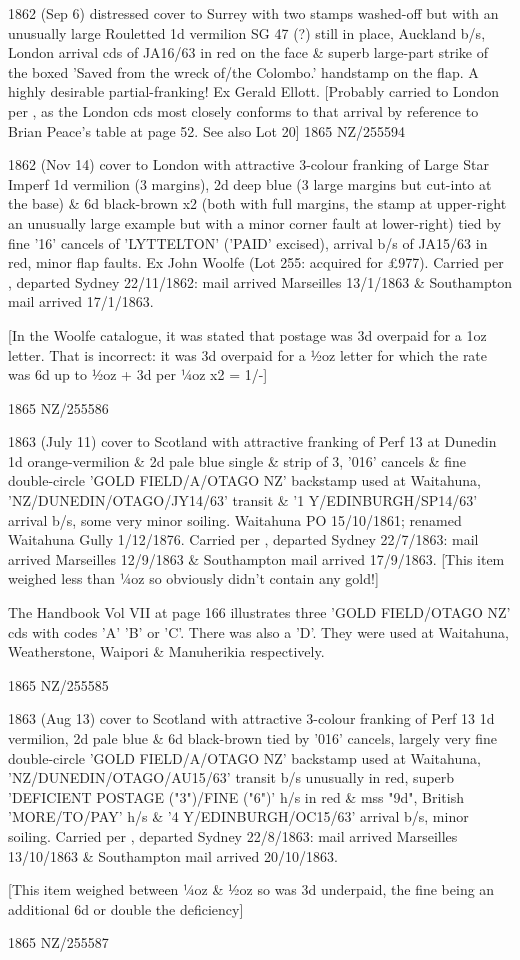 \documentclass[justified]{tufte-book}
\begin{document}
%
{1862 (Sep 6) distressed cover to Surrey with two stamps washed-off but with an unusually large Rouletted 1d vermilion SG 47 (?) still in place, Auckland b/s, London arrival cds of JA16/63 in red on the face \& superb large-part strike of the boxed 'Saved from the wreck of/the Colombo.' handstamp on the flap. A highly desirable partial-franking! Ex Gerald Ellott. [Probably carried to London per , as the London cds most closely conforms to that arrival by reference to Brian Peace's table at page 52. See also Lot 20]}%
{1865}%
{NZ/255594}%
{}%
{}
{}%
{}%

%
{1862 (Nov 14) cover to London with attractive 3-colour franking of Large Star Imperf 1d vermilion (3 margins), 2d deep blue (3 large margins but cut-into at the base) \& 6d black-brown x2 (both with full margins, the stamp at upper-right an unusually large example but with a minor corner fault at lower-right) tied by fine '16' cancels of 'LYTTELTON' ('PAID' excised), arrival b/s of JA15/63 in red, minor flap faults. Ex John Woolfe (Lot 255: acquired for £977). Carried per , departed Sydney 22/11/1862: mail arrived Marseilles 13/1/1863 \& Southampton mail arrived 17/1/1863. 

[In the Woolfe catalogue, it was stated that postage was 3d overpaid for a 1oz letter. That is incorrect: it was 3d overpaid for a ½oz letter for which the rate was 6d up to ½oz + 3d per ¼oz x2 = 1/-]}%
{1865}%
{NZ/255586}%
{}%
{}
{}%
{}%

%
{1863 (July 11) cover to Scotland with attractive franking of Perf 13 at Dunedin 1d orange-vermilion \& 2d pale blue single \& strip of 3, '016' cancels \& fine double-circle 'GOLD FIELD/A/OTAGO NZ' backstamp used at Waitahuna, 'NZ/DUNEDIN/OTAGO/JY14/63' transit \& '1 Y/EDINBURGH/SP14/63' arrival b/s, some very minor soiling. Waitahuna PO 15/10/1861; renamed Waitahuna Gully 1/12/1876. Carried per , departed Sydney 22/7/1863: mail arrived Marseilles 12/9/1863 \& Southampton mail arrived 17/9/1863. [This item weighed less than ¼oz so obviously didn't contain any gold!] 

The Handbook Vol VII at page 166 illustrates three 'GOLD FIELD/OTAGO NZ' cds with codes 'A' 'B' or 'C'. There was also a 'D'. They were used at Waitahuna, Weatherstone, Waipori \& Manuherikia respectively.}%
{1865}%
{NZ/255585}%
{}%
{}
{}%
{}%

%
{1863 (Aug 13) cover to Scotland with attractive 3-colour franking of Perf 13 1d vermilion, 2d pale blue \& 6d black-brown tied by '016' cancels, largely very fine double-circle 'GOLD FIELD/A/OTAGO NZ' backstamp used at Waitahuna, 'NZ/DUNEDIN/OTAGO/AU15/63' transit b/s unusually in red, superb 'DEFICIENT POSTAGE ("3")/FINE ("6")' h/s in red \& mss "9d", British 'MORE/TO/PAY' h/s \& '4 Y/EDINBURGH/OC15/63' arrival b/s, minor soiling. Carried per , departed Sydney 22/8/1863: mail arrived Marseilles 13/10/1863 \& Southampton mail arrived 20/10/1863. 

[This item weighed between ¼oz \& ½oz so was 3d underpaid, the fine being an additional 6d or double the deficiency]}%
{1865}%
{NZ/255587}%
{}%
{}
{}%
{}%
\end{document}
